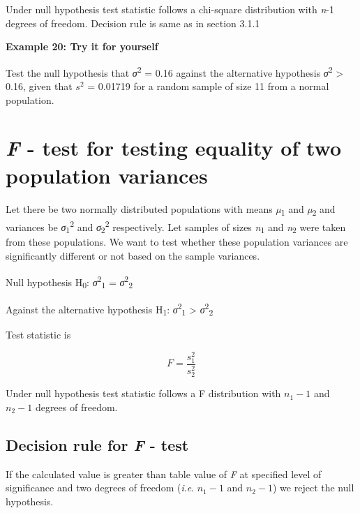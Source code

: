 \documentclass[
]{book}
\begin{document}
Under null hypothesis test statistic follows a chi-square distribution with \emph{n}-1 degrees of freedom. Decision rule is same as in section 3.1.1

\textbf{Example 20: Try it for yourself}

Test the null hypothesis that \emph{σ}\textsuperscript{2} = 0.16 against the alternative hypothesis \emph{σ}\textsuperscript{2} \textgreater{} 0.16, given that \(s^{2}\) = 0.01719 for a random sample of size 11 from a normal population.

\hypertarget{f---test-for-testing-equality-of-two-population-variances}{%
\section{\texorpdfstring{\emph{F} - test for testing equality of two population variances}{F - test for testing equality of two population variances}}\label{f---test-for-testing-equality-of-two-population-variances}}

Let there be two normally distributed populations with means \emph{µ}\textsubscript{1} and \emph{µ}\textsubscript{2} and variances be \emph{σ}\textsubscript{1}\textsuperscript{2} and \emph{σ}\textsubscript{2}\textsuperscript{2} respectively. Let samples of sizes \emph{n}\textsubscript{1} and \emph{n}\textsubscript{2} were taken from these populations. We want to test whether these population variances are significantly different or not based on the sample variances.

Null hypothesis H\textsubscript{0}: \emph{σ}\textsuperscript{2}\textsubscript{1} = \emph{σ}\textsuperscript{2}\textsubscript{2}

Against the alternative hypothesis H\textsubscript{1}: \emph{σ}\textsuperscript{2}\textsubscript{1} \textgreater{} \emph{σ}\textsuperscript{2}\textsubscript{2}

Test statistic is

\[F = \frac{s_{1}^{2}}{s_{2}^{2}}\]

Under null hypothesis test statistic follows a F distribution with \(n_{1} - 1\) and \(n_{2} - 1\) degrees of freedom.

\hypertarget{decision-rule-for-f---test}{%
\subsection{\texorpdfstring{Decision rule for \emph{F} - test}{Decision rule for F - test}}\label{decision-rule-for-f---test}}

If the calculated value is greater than table value of \emph{F} at specified level of significance and two degrees of freedom (\emph{i}.\emph{e}. \(n_{1} - 1\) and \(n_{2} - 1\)) we reject the null hypothesis.
\end{document}
